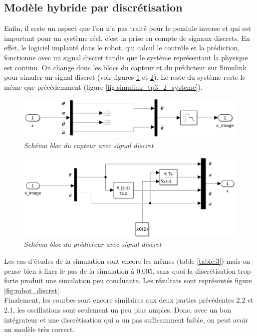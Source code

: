 \documentclass[11pt,french]{article} %
\begin{document}
\subsection{Modèle hybride par discrétisation}

Enfin, il reste un aspect que l'on n'a pas traité pour le pendule inverse et qui est important pour un système réel, c'est la prise en compte de signaux discrets. En effet, le logiciel implanté dans le robot, qui calcul le contrôle et la prédiction, fonctionne avec un signal discret tandis que le système représentant la physique est continu. On change donc les blocs du capteur et du prédicteur sur Simulink pour simuler un signal discret (voir figures \ref{fig:simulink_tp3_3_capteur} et \ref{fig:simulink_tp3_3_predicteur}). Le reste du système reste le même que précédemment (figure \ref{fig:simulink_tp3_2_systeme}). \\

\begin{figure}[H]
    \centering
    \includegraphics[width=12cm]{simulink_tp3_3_capteur.png} 
		\caption{\textit{Schéma bloc du capteur avec signal discret}}
		\label{fig:simulink_tp3_3_capteur}
\end{figure}
\vspace{0.5cm}

\begin{figure}[H]
    \centering
    \includegraphics[width=12cm]{simulink_tp3_3_predicteur.png} 
		\caption{\textit{Schéma bloc du prédicteur avec signal discret}}
		\label{fig:simulink_tp3_3_predicteur}
\end{figure}
\vspace{0.5cm}

Les cas d'études de la simulation sont encore les mêmes (table \ref{table:3}) mais on pense bien à fixer le pas de la simulation à $0.005$, sans quoi la discrétisation trop forte produit une simulation peu concluante. Les résultats sont représentés figure \ref{fig:robot_discret}. \\
Finalement, les courbes sont encore similaires aux deux parties précédentes 2.2 et 2.1, les oscillations sont seulement un peu plus amples. Donc, avec un bon intégrateur et une discrétisation qui a un pas suffisamment faible, on peut avoir un modèle très correct.
\end{document}
